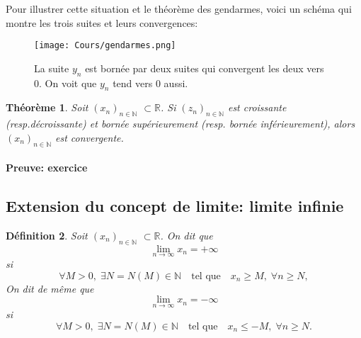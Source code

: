\documentclass[a4paper, 12pt, french, twoside]{article}
\newtheorem{theorem}{Théorème}[section]
\newtheorem{defi}[theorem]{Définition}
\newcommand{\Nn}{{\mathbb{N}}}
\newcommand{\Rr}{{\mathbb{R}}}
\begin{document}
Pour illustrer cette situation et le théorème des gendarmes, voici un schéma qui montre les trois suites et leurs convergences:

\begin{figure}[H]
    \centering
    \texttt{[image: Cours/gendarmes.png]}
    \caption{La suite $y_n$ est bornée par deux suites qui convergent les deux vers 0. On voit que $y_n$ tend vers 0 aussi.}
    \label{fig:enter-label}
\end{figure}

\begin{theorem}\label{4.5}
    Soit $(x_n)_{n\in\Nn}$ $\subset \Rr$. Si $(z_n)_{n\in\Nn}$ est croissante (resp.décroissante) et bornée supérieurement (resp. bornée inférieurement), alors $(x_n)_{n\in\Nn}$ est convergente.
\end{theorem}

\paragraph{Preuve: exercice}
\subsection{Extension du concept de limite: limite infinie}\label{limite infinie suite}
\begin{defi}
    

Soit $(x_n)_{n\in\Nn}$ $\subset \Rr$. On dit que 
\begin{equation*}
    \lim_{n\rightarrow\infty}x_n=+\infty
\end{equation*}
si
\begin{equation*}
    \forall M>0, \; \exists N=N(M)\in\Nn \quad\text{tel que} \quad x_n\geq M, \; \forall n\geq N,
\end{equation*}
On dit de même que 
\begin{equation*}
    \lim_{n\rightarrow\infty}x_n=-\infty
\end{equation*}
si
\begin{equation*}
    \forall M>0, \; \exists N=N(M)\in\Nn \quad \text{tel que} \quad x_n\leq -M, \;\forall n\geq N.
\end{equation*}
\end{defi}
\end{document}
